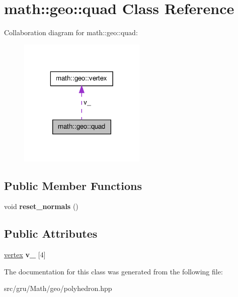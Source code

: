 \hypertarget{classmath_1_1geo_1_1quad}{\section{math\-:\-:geo\-:\-:quad \-Class \-Reference}
\label{classmath_1_1geo_1_1quad}
}


\-Collaboration diagram for math\-:\-:geo\-:\-:quad\-:
\nopagebreak
\begin{figure}[H]
\begin{center}
\leavevmode
\includegraphics[width=172pt]{classmath_1_1geo_1_1quad__coll__graph}
\end{center}
\end{figure}
\subsection*{\-Public \-Member \-Functions}
\begin{DoxyCompactItemize}
\item 
\hypertarget{classmath_1_1geo_1_1quad_a61f7422d3d82b7acab0aabd71b68fccf}{void {\bfseries reset\-\_\-normals} ()}\label{classmath_1_1geo_1_1quad_a61f7422d3d82b7acab0aabd71b68fccf}

\end{DoxyCompactItemize}
\subsection*{\-Public \-Attributes}
\begin{DoxyCompactItemize}
\item 
\hypertarget{classmath_1_1geo_1_1quad_a6625bbd8467b8a853aae1f4f2a2362ec}{\hyperlink{classmath_1_1geo_1_1vertex}{vertex} {\bfseries v\-\_\-} \mbox{[}4\mbox{]}}\label{classmath_1_1geo_1_1quad_a6625bbd8467b8a853aae1f4f2a2362ec}

\end{DoxyCompactItemize}


\-The documentation for this class was generated from the following file\-:\begin{DoxyCompactItemize}
\item 
src/gru/\-Math/geo/polyhedron.\-hpp\end{DoxyCompactItemize}
